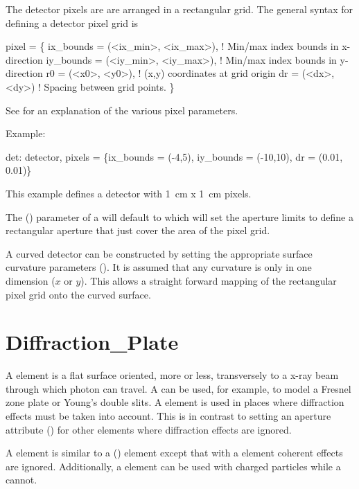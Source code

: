 The detector pixels are are arranged in a rectangular grid. The general syntax for defining
a detector pixel grid is
\begin{example}
  pixel = \{
      ix_bounds = (<ix_min>, <ix_max>),  ! Min/max index bounds in x-direction
      iy_bounds = (<iy_min>, <iy_max>),  ! Min/max index bounds in y-direction
      r0 = (<x0>, <y0>),                 ! (x,y) coordinates at grid origin
      dr = (<dx>, <dy>)                  ! Spacing between grid points.
          \}
\end{example}
See  for an explanation of the various pixel parameters.

Example:
\begin{example}
  det: detector, pixels = 
          \{ix_bounds = (-4,5), iy_bounds = (-10,10), dr = (0.01, 0.01)\}
\end{example}
This example defines a detector with 1~cm x 1~cm pixels.

The  () parameter of a  will default to  which
will set the aperture limits to define a rectangular aperture that just cover the area of the pixel
grid.

A curved detector can be constructed by setting the appropriate surface curvature parameters
(). It is assumed that any curvature is only in one dimension ($x$ or $y$). This
allows a straight forward mapping of the rectangular pixel grid onto the curved surface.

\newpage

\section{Diffraction_Plate}
\label{s:diff.plate}

A  element is a flat surface oriented, more or
less, transversely to a x-ray beam through which photon can travel. A
 can be used, for example, to model a Fresnel
zone plate or Young's double slits. A  element
is used in places where diffraction effects must be taken into
account. This is in contrast to setting an aperture attribute
() for other elements where diffraction effects are
ignored.

A  element is similar to a 
() element except that with a  element coherent
effects are ignored. Additionally, a  element can be used
with charged particles while a  cannot.

